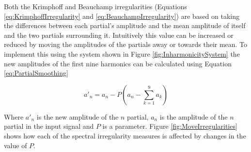 			Both the Krimphoff and Beauchamp irregularities (Equations \ref{eq:KrimphoffIrregularity} and
			\ref{eq:BeauchampIrregularity}) are based on taking the differences between each partial's
			amplitude and the mean amplitude of itself and the two partials surrounding it. Intuitively this
			value can be increased or reduced by moving the amplitudes of the partials away or towards their
			mean. To implement this using the system shown in Figure \ref{fig:InharmonicitySystem} the new
			amplitudes of the first nine harmonics can be calculated using Equation \ref{eq:PartialSmoothing}
			
			\begin{equation}
				a'_{n} = a_{n} - P \left(a_{n} - \sum_{k = 1}^{9} a_{k} \right)
				\label{eq:PartialSmoothing}
			\end{equation}

			Where $a'_{n}$ is the new amplitude of the $n$ partial, $a_{n}$ is the amplitude of the
			$n$ partial in the input signal and $P$ is a parameter. Figure
			\ref{fig:MoveIrregularities} shows how each of the spectral irregularity measures is affected by
			changes in the value of $P$.

